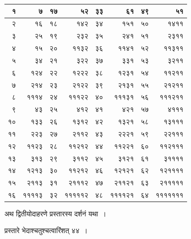 \documentclass[11pt, openany]{book}
\begin{document}
\begin{table}[h]
	\centering
\begin{tabular}{|r|r|r|r|r|r|r|r|}
	
\hline
१ & ७ & १७ & ५२ & ३३ & ६१ & ४९ & ५१\\
\hline
२ & १६ & १८ & १४२ & ३४ & १५१ & ५० & १४११\\
\hline
३ & २५ & १९ & २३२ & ३५ & २४१ & ५१ & २३११\\
\hline
४ & १५ & २० & ११३२ & ३६ & ११४१ & ५२ & ११३११\\
\hline
५ & ३४ & २१ & ३२२ & ३७ & ३३१ & ५३ & ३२११\\
\hline
६ & १२४ & २२ & १२२२ & ३८ & १२३१ & ५४ & ११२११ \\
\hline
७ & २१४ & २३ & २१२२ & ३९ & २१३१ & ५५ & २१२११\\
\hline
८ & १११४ & २४ & १११२२ & ४० & १११३१ & ५६ & १११२११  \\
\hline 
९ & ४३ & २५ & ४१२ & ४१ & ४२१  & ५७ & ४१११ \\
\hline
१० & १३३ & २६ & १३१२ & ४२ & १३२१ & ५८ & १३१११ \\
\hline
११ & २२३ & २७ & २११२ & ४३ & २२२१ & ५९ & २२१११ \\
\hline
१२ & ११२३ & २८ & ११२१२ & ४४ & ११२२१ & ६० & ११२१११\\
\hline
१३ & ३१३ & २९ & ३११२ & ४५ & ३१२१ & ६१ & ३११११\\
\hline
१४ & १२१३ & ३० & ११२१२ & ४६ & १२१२१ & ६२ & १२११११ \\
\hline
१५ & २११३ & ३१ & २१११२ & ४७ & २११२१ & ६३ & २१११११  \\
\hline
१६ & ११११३ & ३२ & १११११२ & ४८ & ११११२१ & ६४ & १११११११  \\
\hline
\end{tabular}
\end{table}

अथ द्वितीयोदाहरणे प्रस्तारस्य दर्शनं यथा~।
\vspace{2mm}

प्रस्तारे भेदाश्चतुश्चत्वारिंशत् ४४~।
\end{document}
